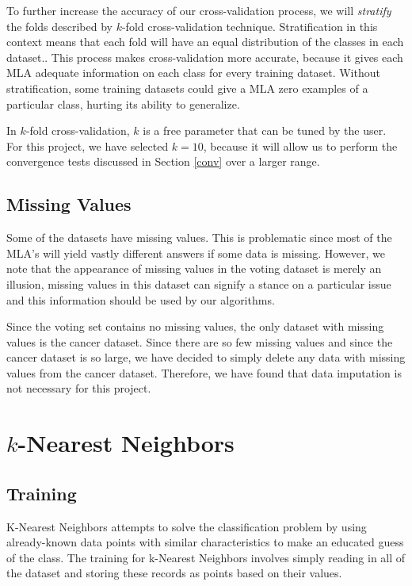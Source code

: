 \documentclass{article}
\begin{document}
		To further increase the accuracy of our cross-validation process, we will \textit{stratify} the folds described by $k$-fold cross-validation technique. 
		Stratification in this context means that each fold will have an equal distribution of the classes in each dataset..
		This process makes cross-validation more accurate, because it gives each MLA adequate information on each class for every training dataset.
		Without stratification, some training datasets could give a MLA zero examples of a particular class, hurting its ability to generalize.
		
		In $k$-fold cross-validation, $k$ is a free parameter that can be tuned by the user. For this project, we have selected $k = 10$, because it will allow us to perform the convergence tests discussed in Section \ref{conv} over a larger range.
	
	\subsection{Missing Values}
	
		Some of the datasets have missing values. 
		This is problematic since most of the MLA's will yield vastly different answers if some data is missing. 
		However, we note that the appearance of missing values in the voting dataset is merely an illusion, missing values in this dataset can signify a stance on a particular issue and this information should be used by our algorithms. 
		
		Since the voting set contains no missing values, the only dataset with missing values is the cancer dataset. Since there are so few missing values and since the cancer dataset is so large, we have decided to simply delete any data with missing values from the cancer dataset. Therefore, we have found that data imputation is not necessary for this project. 
	
\section{$k$-Nearest Neighbors}
	\subsection{Training}
		K-Nearest Neighbors attempts to solve the classification problem by using already-known data points with similar characteristics to make an educated guess of the class.  The training for k-Nearest Neighbors involves simply reading in all of the dataset and storing these records as points based on their values.
\end{document}
